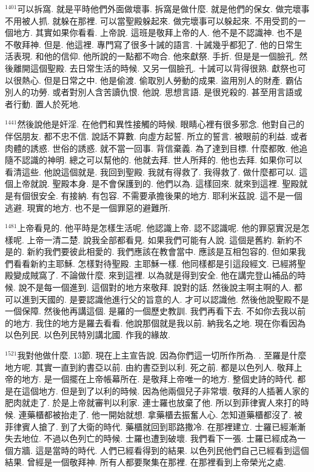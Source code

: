 \documentclass{book}
\begin{document}
$^{1401}$可以拆窩.
就是平時他們外面做壞事.
拆窩是做什麼.
就是他們的保女.
做完壞事不用被人抓.
就躲在那裡.
可以當聖殿躲起來.
做完壞事可以躲起來.
不用受罰的一個地方.
其實如果你看看.
上帝說.
這班是敬拜上帝的人.
他不是不認識神.
也不是不敬拜神.
但是.
他這裡.
專門寫了很多十誡的語言.
十誡幾乎都犯了.
他的日常生活表現.
和他的信仰.
他所說的一點都不吻合.
他來獻祭.
手折.
但是是一個臉孔.
然後離開這個聖殿.
去日常生活的時候.
又另一個臉孔.
十誡可以背得很熟.
獻祭也可以很熱心.
但是日常之中.
他是偷渡.
偷取別人勞動的成果.
盜用別人的財產.
霸佔別人的功勞.
或者對別人含苦讀仇恨.
他說.
思想言語.
是很兇殺的.
甚至用言語或者行動.
置人於死地.

$^{1441}$然後說他是奸淫.
在他們和異性接觸的時候.
眼睛心裡有很多邪念.
他對自己的伴侶朋友.
都不忠不信.
說話不算數.
向虛方起誓.
所立的誓言.
被眼前的利益.
或者肉體的誘惑.
世俗的誘惑.
就不當一回事.
背信棄義.
為了達到目標.
什麼都敗.
他追隨不認識的神明.
總之可以幫他的.
他就去拜.
世人所拜的.
他也去拜.
如果你可以看清這些.
他說這個就是.
我回到聖殿.
我就有得救了.
我得救了.
做什麼都可以.
這個上帝就說.
聖殿本身.
是不會保護到的.
他們以為.
這樣回來.
就來到這裡.
聖殿就是有個很安全.
有接納.
有包容.
不需要承擔後果的地方.
耶利米茲說.
這不是一個逃避.
現實的地方.
也不是一個罪惡的避難所.

$^{1481}$上帝看見的.
他平時是怎樣生活呢.
他認識上帝.
認不認識呢.
他的罪惡實況是怎樣呢.
上帝一清二楚.
說我全部都看見.
如果我們可能有人說.
這個是舊約.
新約不是的.
新約我們要彼此相愛的.
我們應該在教會當中.
應該是互相包容的.
但如果我們看看新約主耶穌.
怎樣對待聖殿.
主耶穌一樣.
他同樣都是引這段經文.
已經將聖殿變成賊窩了.
不論做什麼.
來到這裡.
以為就是得到安全.
他在講完登山補品的時候.
說不是每一個進到.
這個對的地方來敬拜.
說對的話.
然後說主啊主啊的人.
都可以進到天國的.
是要認識他進行父的旨意的人.
才可以認識他.
然後他說聖殿不是一個保障.
然後他再講這個.
是羅的一個歷史教訓.
我們再看下去.
不如你去我以前的地方.
我住的地方是羅去看看.
他說那個就是我以前.
納我名之地.
現在你看因為以色列民.
以色列民特別講北國.
作我的緣故.

$^{1521}$我對他做什麼.
13節.
現在上主宣告說.
因為你們這一切所作所為.
.
至羅是什麼地方呢.
其實一直到約書亞以前.
由約書亞到以利.
死之前.
都是以色列人.
敬拜上帝的地方.
是一個擺在上帝帳幕所在.
是敬拜上帝唯一的地方.
整個史詩的時代.
都是在這個地方.
但是到了以利的時候.
因為他兩個兒子非常壞.
敬拜的人插著人家的肥肉就走了.
於是上帝就審判以利家.
連士羅也放棄了他.
所以到菲律賓人來打的時候.
連藥櫃都被抬走了.
他一開始就想.
拿藥櫃去振奮人心.
怎知道藥櫃都沒了.
被菲律賓人搶了.
到了大衛的時代.
藥櫃就回到耶路撒冷.
在那裡建立.
士羅已經漸漸失去地位.
不過以色列亡的時候.
士羅也遭到破壞.
我們看下一張.
士羅已經成為一個方牆.
這是當時的時代.
人們已經看得到的結果.
以色列民他們自己已經看到這個結果.
曾經是一個敬拜神.
所有人都要聚集在那裡.
在那裡看到上帝榮光之處.
\end{document}
